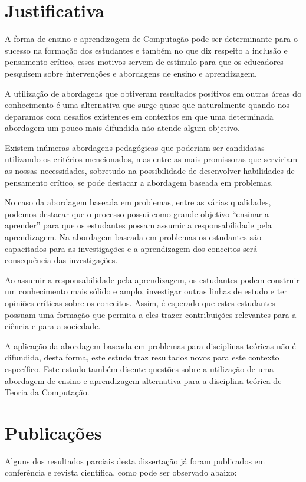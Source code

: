 \section{Justificativa}
A forma de ensino e aprendizagem de Computação pode
ser determinante para o sucesso na formação dos
estudantes e também no que diz respeito a inclusão
e pensamento crítico, esses motivos servem de estímulo
para que os educadores pesquisem sobre intervenções e
abordagens de ensino e aprendizagem.

A utilização de abordagens que obtiveram
resultados positivos em outras áreas do conhecimento é uma
alternativa que surge quase que naturalmente quando
nos deparamos com desafios existentes em contextos
em que uma determinada abordagem um pouco mais difundida
não atende algum objetivo.

Existem inúmeras abordagens pedagógicas que poderiam ser
candidatas utilizando os critérios mencionados,
mas entre as mais promissoras que serviriam
as nossas necessidades, sobretudo na possibilidade
de desenvolver habilidades de pensamento crítico, se
pode destacar a abordagem baseada em problemas.

No caso da abordagem baseada em problemas, entre as
várias qualidades, podemos destacar que o processo
possui como grande objetivo ``ensinar a aprender'' para
que os estudantes possam assumir a
responsabilidade pela aprendizagem.
Na abordagem baseada em problemas os estudantes
são capacitados para as investigações e a aprendizagem
dos conceitos será consequência das investigações.

Ao assumir a responsabilidade pela aprendizagem, os
estudantes podem construir um conhecimento mais sólido
e amplo, investigar outras linhas de estudo e ter opiniões
críticas sobre os conceitos.
Assim, é esperado que estes estudantes possuam uma
formação que permita a eles trazer contribuições
relevantes para a ciência e para a sociedade.

A aplicação da abordagem baseada em problemas
para disciplinas teóricas não é difundida, desta forma,
este estudo traz resultados novos para este contexto
específico.
Este estudo também discute questões sobre a utilização
de uma abordagem de ensino e aprendizagem alternativa
para a disciplina teórica de Teoria da Computação.

\section{Publicações}
\label{sec-publicacoes}
Alguns dos resultados parciais desta dissertação já
foram publicados em conferência e revista científica,
como pode ser observado abaixo:
\begin{itemize}

\end{itemize}

